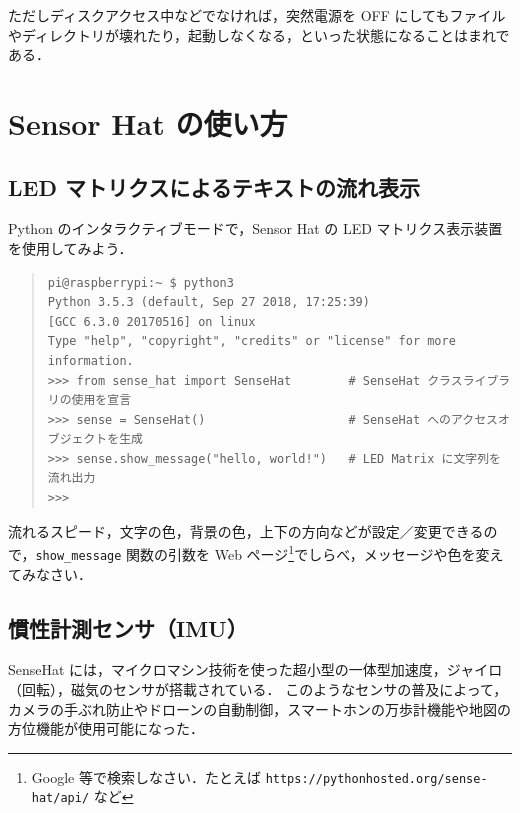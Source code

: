 \documentclass[11pt,a4,epsf]{report}
\begin{document}
ただしディスクアクセス中などでなければ，突然電源を OFF にしてもファイルやディレクトリが壊れたり，起動しなくなる，といった状態になることはまれである．


\section{Sensor Hat の使い方}

\subsection{LED マトリクスによるテキストの流れ表示}

Python のインタラクティブモードで，Sensor Hat の LED マトリクス表示装置を使用してみよう．
\begin{quote}
\small
\begin{verbatim}
pi@raspberrypi:~ $ python3
Python 3.5.3 (default, Sep 27 2018, 17:25:39) 
[GCC 6.3.0 20170516] on linux
Type "help", "copyright", "credits" or "license" for more information.
>>> from sense_hat import SenseHat        # SenseHat クラスライブラリの使用を宣言
>>> sense = SenseHat()                    # SenseHat へのアクセスオブジェクトを生成
>>> sense.show_message("hello, world!")   # LED Matrix に文字列を流れ出力
>>> 
\end{verbatim}
\end{quote}

\begin{excercise}
流れるスピード，文字の色，背景の色，上下の方向などが設定／変更できるので，\verb+show_message+ 関数の引数を Web ページ\footnote{Google 等で検索しなさい．たとえば {\tt https://pythonhosted.org/sense-hat/api/} など}でしらべ，メッセージや色を変えてみなさい．
\end{excercise}

\subsection{慣性計測センサ（IMU）}

SenseHat には，マイクロマシン技術を使った超小型の一体型加速度，ジャイロ（回転），磁気のセンサが搭載されている．
このようなセンサの普及によって，カメラの手ぶれ防止やドローンの自動制御，スマートホンの万歩計機能や地図の方位機能が使用可能になった．
\end{document}
